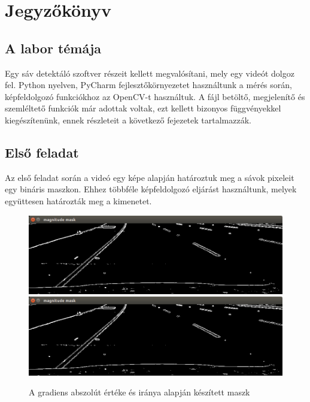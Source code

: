 \chapter{Jegyzőkönyv}
\section{A labor témája}
Egy sáv detektáló szoftver részeit kellett megvalósítani, mely egy videót dolgoz fel. 
Python nyelven, PyCharm fejlesztőkörnyezetet használtunk a mérés során, képfeldolgozó funkciókhoz az OpenCV-t használtuk. 
A fájl betöltő, megjelenítő és szemléltető funkciók már adottak voltak, ezt kellett bizonyos függvényekkel kiegészítenünk, ennek részleteit a következő fejezetek tartalmazzák.

\section{Első feladat}
Az első feladat során a videó egy képe alapján határoztuk meg a sávok pixeleit egy bináris maszkon. 
Ehhez többféle képfeldolgozó eljárást használtunk, melyek együttesen határozták meg a kimenetet.

\begin{figure}[!ht]
	\includegraphics[width=150mm,keepaspectratio]{figures/m09/mag-mask.png}\vspace{2mm}
	\includegraphics[width=150mm,keepaspectratio]{figures/m09/mag-mask.png}
	\caption{A gradiens abszolút értéke és iránya alapján készített maszk}
	\label{fig:MagDirMask}
\end{figure}

